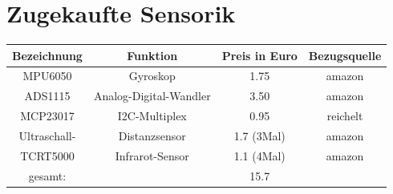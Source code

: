 \documentclass[twoside,11pt, a4paper]{report}
\begin{document}
	
	\section{Zugekaufte Sensorik}
	\begin{center}
		\begin{tabular}{|c|c|c|c|}
			\hline
			Bezeichnung			&Funktion				& Preis	in Euro			&Bezugsquelle\\
			\hline
			MPU6050				&Gyroskop				& 1.75			& amazon		\\
			ADS1115				&Analog-Digital-Wandler	& 3.50			& amazon		\\
			MCP23017			&I2C-Multiplex			& 0.95			& reichelt		\\
			Ultraschall-		&Distanzsensor			& 1.7 (3Mal)	& amazon		\\
			TCRT5000			&Infrarot-Sensor		& 1.1 (4Mal)	& amazon		\\
			\hline
			gesamt:			&						&15.7			&\\
			\hline			
		\end{tabular}
	\end{center}
	
\end{document}

